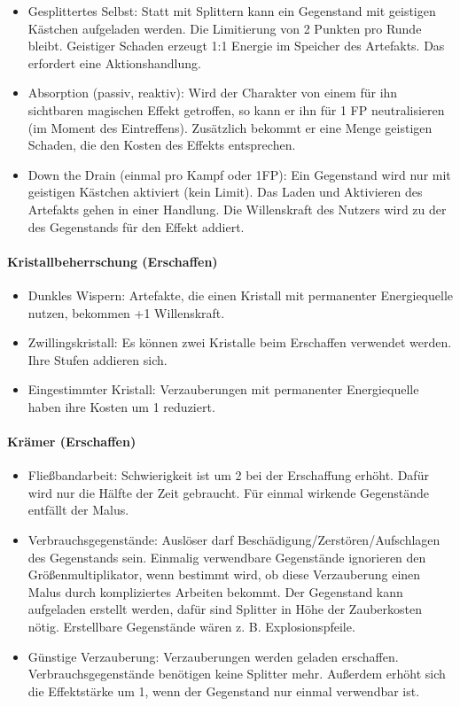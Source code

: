 \documentclass{article}
\begin{document}
\begin{itemize}
\item Gesplittertes Selbst: Statt mit Splittern kann ein Gegenstand mit geistigen Kästchen aufgeladen werden. Die Limitierung von 2 Punkten pro Runde bleibt. Geistiger Schaden erzeugt 1:1 Energie im Speicher des Artefakts. Das erfordert eine Aktionshandlung.
\item Absorption (passiv, reaktiv): Wird der Charakter von einem für ihn sichtbaren magischen Effekt getroffen, so kann er ihn für 1 FP neutralisieren (im Moment des Eintreffens). Zusätzlich bekommt er eine Menge geistigen Schaden, die den Kosten des Effekts entsprechen.
\item Down the Drain (einmal pro Kampf oder 1FP): Ein Gegenstand wird nur mit geistigen Kästchen aktiviert (kein Limit). Das Laden und Aktivieren des Artefakts gehen in einer Handlung. Die Willenskraft des Nutzers wird zu der des Gegenstands für den Effekt addiert.
\end{itemize}

\paragraph{Kristallbeherrschung (Erschaffen)}

\begin{itemize}
\item Dunkles Wispern: Artefakte, die einen Kristall mit permanenter Energiequelle nutzen, bekommen +1 Willenskraft.
\item Zwillingskristall: Es können zwei Kristalle beim Erschaffen verwendet werden. Ihre Stufen addieren sich.
\item Eingestimmter Kristall: Verzauberungen mit permanenter Energiequelle haben ihre Kosten um 1 reduziert.
\end{itemize}

\paragraph{Krämer (Erschaffen)}

\begin{itemize}
\item Fließbandarbeit: Schwierigkeit ist um 2 bei der Erschaffung erhöht. Dafür wird nur die Hälfte der Zeit gebraucht. Für einmal wirkende Gegenstände entfällt der Malus.
\item Verbrauchsgegenstände: Auslöser darf Beschädigung/Zerstören/Aufschlagen des Gegenstands sein. Einmalig verwendbare Gegenstände ignorieren den Größenmultiplikator, wenn bestimmt wird, ob diese Verzauberung einen Malus durch kompliziertes Arbeiten bekommt. Der Gegenstand kann aufgeladen erstellt werden, dafür sind Splitter in Höhe der Zauberkosten nötig. Erstellbare Gegenstände wären z. B. Explosionspfeile.
\item Günstige Verzauberung: Verzauberungen werden geladen erschaffen. Verbrauchsgegenstände benötigen keine Splitter mehr. Außerdem erhöht sich die Effektstärke um 1, wenn der Gegenstand nur einmal verwendbar ist.
\end{itemize}
\end{document}
